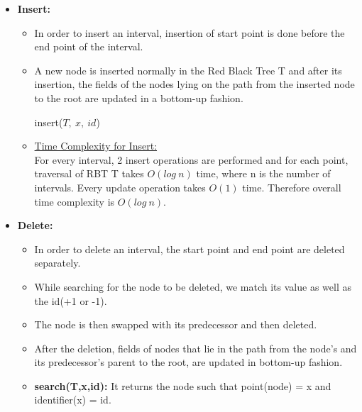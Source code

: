 \documentclass[pdftex,a4paper,12pt]{report}
\begin{document}
\begin{itemize}
  
  \item \textbf{Insert:} 
    \begin{itemize}
      \item In order to insert an interval, insertion of start point is done before the end point of the interval.
      \item A new node is inserted normally in the Red Black Tree T and after its insertion, the fields of the nodes lying on the path from the inserted node to the root are updated in a bottom-up fashion.
   
\begin{algorithm}
\caption{insert($T,\ x,\ id$)}
\end{algorithm}

  \item \underline{Time Complexity for Insert:}	\\
    For every interval, 2 insert operations are performed and for each point, traversal of RBT T takes $O(log\ n)$ time, where n is the number of intervals.
    Every update operation takes $O(1)$ time. Therefore overall time complexity is $O(log\ n)$.
  \end{itemize}
  

\item \textbf{Delete:}
  \begin{itemize}
    \item In order to delete an interval, the start point and end point are deleted separately.
    \item While searching for the node to be deleted, we match its value as well as the id(+1 or -1).
    \item The node is then swapped with its predecessor and then deleted.
    \item After the deletion, fields of nodes that lie in the path from the node's and its predecessor’s parent to the root, are updated in bottom-up fashion.
    \item \textbf{search(T,x,id):} It returns the node such that point(node) = x and identifier(x) = id.


\end{itemize}
\end{itemize}
\end{document}
